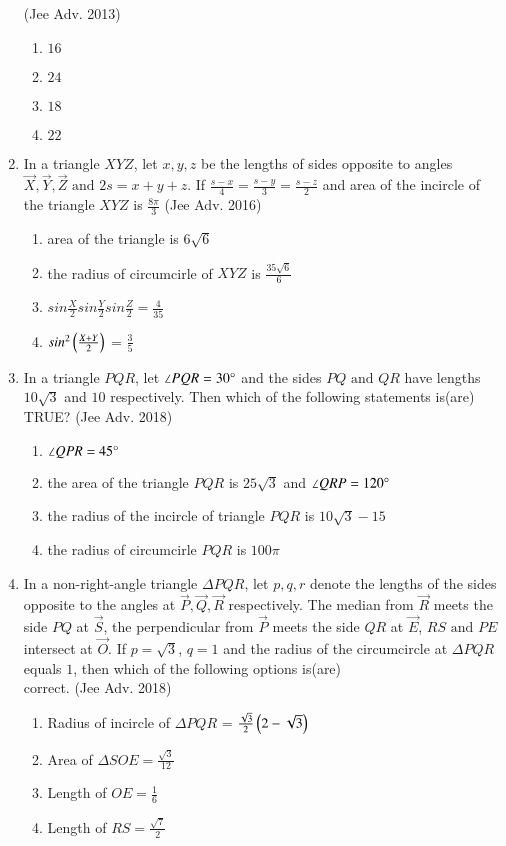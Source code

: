 \documentclass[journal,12pt,twocolumn]{IEEEtran}
\theoremstyle{remark}
\begin{document}
\begin{enumerate}
    \hfill{(Jee Adv. 2013)}
    \begin{multicols}{2}
    \begin{enumerate}
    \item $16$
    \item $24$
    \item $18$
    \item $22$
    \end{enumerate}
    \end{multicols}
    \item In a triangle $XYZ$, let $x,y,z$ be the lengths of sides opposite to angles $\vec{X},\vec{Y},\vec{Z} \text{ and } 2s = x+y+z$. If ${\frac{s-x}{4}}={\frac{s-y}{3}}={\frac{s-z}{2}}$ and area of the incircle of the triangle $XYZ$ is ${\frac{8\pi}{3}}$
    \hfill{(Jee Adv. 2016)}
    \begin{enumerate}
    \item area of the triangle is $6\sqrt{6}$
    \item the radius of circumcirle of $XYZ$ is ${\frac{35\sqrt{6}}{6}}$
    \item $sin\frac{X}{2}sin\frac{Y}{2}sin\frac{Z}{2} = \frac{4}{35}$
    \item $sin^{2}\left(\frac{X+Y}{2}\right)$ = $\frac{3}{5}$
    \end{enumerate}
    \item In a triangle $PQR$, let $\angle PQR = 30\degree$ and the sides $PQ \text{ and } QR$ have lengths $10\sqrt{3}$ and $10$ respectively. Then which of the following statements is(are) TRUE?
    \hfill{(Jee Adv. 2018)}
    \begin{enumerate}
    \item $\angle QPR = 45\degree$
    \item the area of the triangle $PQR$ is $25\sqrt{3}$ and $\angle QRP = 120\degree$
    \item the radius of the incircle of triangle $PQR$ is $10\sqrt{3}-15$
    \item the radius of circumcirle $PQR$ is $100\pi$
    \end{enumerate}
    \item In a non-right-angle triangle $\Delta PQR$, let $p,q,r$ denote the lengths of the sides opposite to the angles at $\vec{P},\vec{Q},\vec{R}$ respectively. The median from $\vec{R}$ meets the side $PQ$ at $\vec{S}$, the perpendicular from $\vec{P}$ meets the side $QR$ at $\vec{E}$, $RS \text{ and } PE$ intersect at $\vec{O}$. If $p = \sqrt{3}$, $q = 1$ and the radius of the circumcircle at $\Delta PQR$ equals $1$, then which of the following options is(are)\\ correct.
    \hfill{(Jee Adv. 2018)}
    \begin{enumerate}
    \item Radius of incircle of $\Delta PQR$ = $\frac{\sqrt{3}}{2}\left(2-\sqrt{3}\right)$
    \item Area of $\Delta SOE = \frac{\sqrt{3}}{12}$
    \item Length of $OE = \frac{1}{6}$
    \item Length of $RS = \frac{\sqrt{7}}{2}$
    \end{enumerate}

\end{enumerate}
\end{document}
